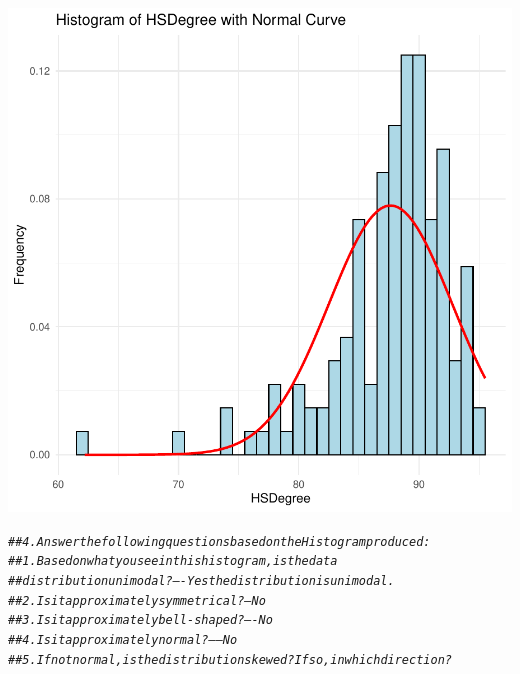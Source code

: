 \documentclass{article}\usepackage[]{graphicx}\usepackage[]{xcolor}
\makeatletter
\newcommand{\hlcom}[1]{\textcolor[rgb]{0.678,0.584,0.686}{\textit{#1}}}%
\newenvironment{kframe}{%
 \def\at@end@of@kframe{}%
 \ifinner\ifhmode%
  \def\at@end@of@kframe{\end{minipage}}%
  \begin{minipage}{\columnwidth}%
 \fi\fi%
 \def\FrameCommand##1{\hskip\@totalleftmargin \hskip-\fboxsep
 \colorbox{shadecolor}{##1}\hskip-\fboxsep
     \hskip-\linewidth \hskip-\@totalleftmargin \hskip\columnwidth}%
 \MakeFramed {\advance\hsize-\width
   \@totalleftmargin\z@ \linewidth\hsize
   \@setminipage}}%
 {\par\unskip\endMakeFramed%
 \at@end@of@kframe}
\newenvironment{knitrout}{}{} %
\makeatother
\begin{document}
\begin{knitrout}
{\centering \includegraphics[width=.6\linewidth]{figure/assignment-03-1-Reppeto-Brian-Rnwunnamed-chunk-1-1} 

}


\begin{kframe}\begin{alltt}
\hlcom{## 4.Answer the following questions based on the Histogram produced:}
\hlcom{##    1. Based on what you see in this histogram, is the data }
\hlcom{##        distribution unimodal? ----  Yes the distribution is unimodal.}
\hlcom{##    2. Is it approximately symmetrical? --- No}
\hlcom{##    3. Is it approximately bell-shaped? ----No}
\hlcom{##    4. Is it approximately normal?-----No}
\hlcom{##    5. If not normal, is the distribution skewed? If so, in which direction?}
\end{alltt}
\end{kframe}
\end{knitrout}
\end{document}
